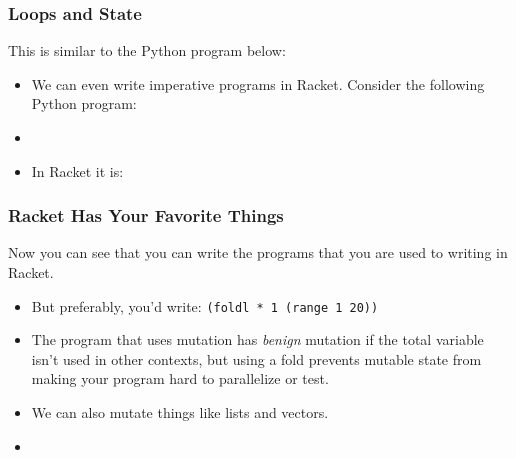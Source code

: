 \documentclass{beamer}
\begin{document}


\begin{frame}
  \frametitle{Loops and State}
  This is similar to the Python program below:
  \mutatePy
  \begin{itemize}
  \item<2-> We can even write imperative programs in Racket. Consider
    the following Python program:
  \item<3-> \productPy
  \item<4-> In Racket it is:
    \product
  \end{itemize}
\end{frame}


\begin{frame}
  \frametitle{Racket Has Your Favorite Things}
  Now you can see that you can write the programs that you are used to writing
  in Racket.
  \begin{itemize}
  \item<2-> But preferably, you'd write: \texttt{(foldl * 1 (range 1 20))}
  \item<3-> The program that uses mutation has \emph{benign} mutation if the
    total variable isn't used in other contexts, but using a fold prevents
    mutable state from making your program hard to parallelize or test.
  \item<4-> We can also mutate things like lists and vectors.
  \item<5-> \mutateList
  \end{itemize}
\end{frame}

\end{document}
